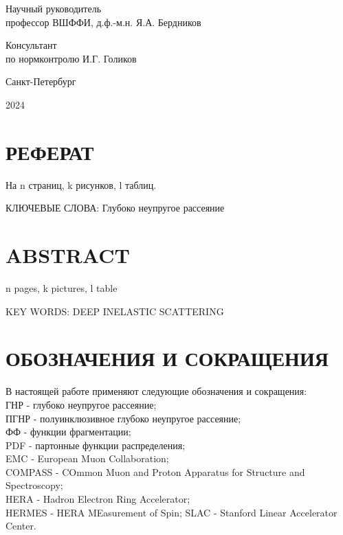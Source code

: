 \begin{titlepage}
\begin{flushleft}
Научный руководитель\\
профессор ВШФФИ, д.ф.-м.н.
\hspace{0.1 cm} \hspace{1.8 cm} 
\hfill  {Я.А. Бердников}
\vspace{0.5cm}

Консультант \\
по нормконтролю \hspace{2.1 cm} \hspace{2 cm} \hfill  {И.Г. Голиков}
\end{flushleft}


\begin{center}
	Санкт-Петербург
\end{center}
\begin{center}
    2024
\end{center}
\newpage
\pagestyle{empty}
\section*{РЕФЕРАТ}
\begin{center}
    На n страниц, k рисунков, l таблиц.
\end{center}
КЛЮЧЕВЫЕ СЛОВА: Глубоко неупругое рассеяние
\\


\section*{ABSTRACT}
\begin{center}
    n pages, k pictures, l table
\end{center} 
KEY WORDS: DEEP INELASTIC SCATTERING
\\

\newpage
\section*{ОБОЗНАЧЕНИЯ И СОКРАЩЕНИЯ}

В настоящей работе применяют следующие обозначения и сокращения: \\
ГНР - глубоко неупругое рассеяние; \\
ПГНР - полуинклюзивное глубоко неупругое рассеяние; \\
ФФ - функции фрагментации; \\
PDF - партонные функции распределения; \\ 
EMC - European Muon Collaboration; \\
COMPASS - COmmon Muon and Proton Apparatus for Structure and
Spectroscopy; \\
HERA - Hadron Electron Ring Accelerator; \\
HERMES - HERA MEasurement of Spin;
SLAC - Stanford Linear Accelerator Center.


\end{titlepage}	
